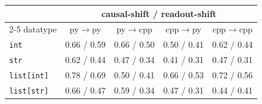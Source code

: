 \begin{tabular}{lcccc}
\toprule
& \multicolumn{4}{c}{causal-shift / readout-shift} \\
\cmidrule(lr){2-5}
datatype & py$\to$py & py$\to$cpp & cpp$\to$py & cpp$\to$cpp \\
\midrule
\texttt{int} & 0.66 / 0.59 & 0.66 / 0.50 & 0.50 / 0.41 & 0.62 / 0.44 \\
\texttt{str} & 0.62 / 0.44 & 0.47 / 0.34 & 0.41 / 0.31 & 0.47 / 0.31 \\
\texttt{list[int]} & 0.78 / 0.69 & 0.50 / 0.41 & 0.66 / 0.53 & 0.72 / 0.56 \\
\texttt{list[str]} & 0.66 / 0.47 & 0.59 / 0.34 & 0.47 / 0.31 & 0.44 / 0.41 \\
\bottomrule
\end{tabular}
